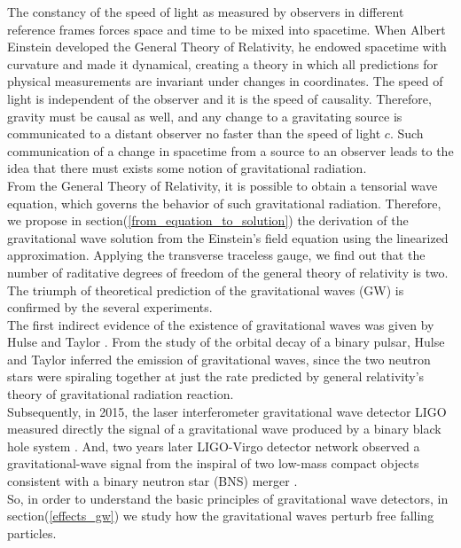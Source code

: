 The constancy of the speed of light as measured by observers in different reference frames forces space and time to be mixed into spacetime.
When Albert Einstein developed the General Theory of Relativity, he endowed spacetime with curvature and made it dynamical, creating a theory in which all predictions for physical measurements are invariant under changes in coordinates.
The speed of light is independent of the observer and it is the speed of causality.
Therefore, gravity must be causal as well, and
any change to a gravitating source is communicated to a distant observer no faster than the speed of light $c$.
Such communication of a change in spacetime from a source to an observer leads to the idea that there must exists some notion of gravitational radiation.\\
From the General Theory of Relativity, it is possible to obtain a tensorial wave equation, which governs the behavior of such gravitational radiation.
Therefore, we propose in  section(\ref{from_equation_to_solution}) the derivation of the gravitational wave solution from the Einstein's field equation using the linearized approximation.
Applying the transverse traceless gauge, we find out that the number of raditative degrees of freedom of the general theory of relativity is two.\\
The triumph of theoretical prediction of the gravitational waves (GW) is confirmed by the several experiments.\\
The first indirect evidence of the existence of gravitational waves was given by Hulse and Taylor \cite{weisberg_relativistic_2004,weisberg_timing_2010}. 
From the study of the orbital decay of a binary pulsar, Hulse and Taylor inferred the emission of gravitational waves, since the two neutron stars were spiraling together at just the rate predicted by general relativity’s theory of gravitational radiation reaction.\\
Subsequently, in 2015, the laser interferometer gravitational wave detector LIGO measured directly the signal of a gravitational wave produced by a binary black hole system \cite{abbott_observation_2016}.
And, two years later LIGO-Virgo detector network observed a gravitational-wave signal from the inspiral of two low-mass compact objects consistent with a binary neutron star (BNS) merger \cite{abbott_gw170817:_2017}.\\
So, in order to understand the basic principles of gravitational wave detectors, in section(\ref{effects_gw}) we study how the gravitational waves perturb free falling particles.\\
